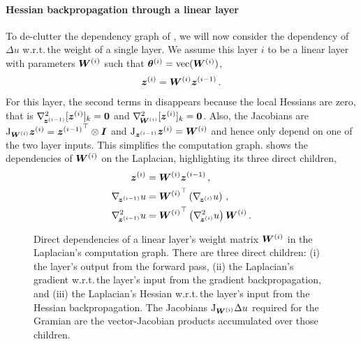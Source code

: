 \paragraph{Hessian backpropagation through a linear layer} To de-clutter the dependency graph of , we will now consider the dependency of $\Delta u$ w.r.t.\,the weight of a single layer.
We assume this layer $i$ to be a linear layer with parameters ${\bm{W}}^{(i)}$ such that ${\bm{\theta}}^{(i)} = \operatorname{vec}({\bm{W}}^{(i)})$,
\begin{align}
  {\bm{z}}^{(i)} = {\bm{W}}^{(i)} {\bm{z}}^{(i-1)}\,.
\end{align}
For this layer, the second terms in  disappears because the local Hessians are zero, that is $\nabla_{\!{{\bm{z}}^{(i-1)}}}^{2}[{\bm{z}}^{(i)}]_k = {\bm{0}}$ and $\nabla_{\!{{\bm{W}}^{(i)}}}^{2}[{\bm{z}}^{(i)}]_k = {\bm{0}}$.
Also, the Jacobians are $\mathrm{J}_{{\bm{W}}^{(i)}}{\bm{z}}^{(i)} = {{\bm{z}}^{(i-1)}}^{\top} \otimes {\bm{I}}$ and $\mathrm{J}_{{\bm{z}}^{(i-1)}}{\bm{z}}^{(i)} = {\bm{W}}^{(i)}$ and hence only depend on one of the two layer inputs.
This simplifies the computation graph.
 shows the dependencies of ${\bm{W}}^{(i)}$ on the
Laplacian, highlighting its three direct children,
\begin{align}\label{eq:spatialDerivatives}
  \begin{split}
    {\bm{z}}^{(i)}
    &=
      {\bm{W}}^{(i)} {\bm{z}}^{(i-1)}\,,
    \\
    \nabla_{\!{{\bm{z}}^{(i-1)}}}u
    &=
      {{\bm{W}}^{(i)}}^{\top}
      \left(
      \nabla_{\!{{\bm{z}}^{(i)}}}u
      \right)\,,
    \\
    \nabla_{\!{{\bm{z}}^{(i-1)}}}^{2}u
    &=
      {{\bm{W}}^{(i)}}^{\top}
      \left(
      \nabla_{\!{{\bm{z}}^{(i)}}}^{2}u
      \right)
      {\bm{W}}^{(i)}\,.
  \end{split}
\end{align}

\begin{figure}[t]
  \centering
  \begin{minipage}[b]{0.495\linewidth}
    \centering
    \resizebox{\linewidth}{!}{%
      
    }
  \end{minipage}
  \hfill
  \begin{minipage}[b]{0.495\linewidth}
    \caption{Direct dependencies of a linear layer's weight matrix ${\bm{W}}^{(i)}$ in the Laplacian's computation graph.
      There are three direct children: (i) the layer's output from the forward pass, (ii) the Laplacian's gradient w.r.t.\,the layer's input from the gradient backpropagation, and (iii) the Laplacian's Hessian w.r.t.\,the layer's input from the Hessian backpropagation.
      The Jacobians $\mathrm{J}_{{\bm{W}}^{(i)}}\Delta u$ required for the Gramian are the vector-Jacobian products accumulated over those children.
    }\label{fig:laplacian-graph-weight}
    \vspace{-1ex}
  \end{minipage}
\end{figure}

